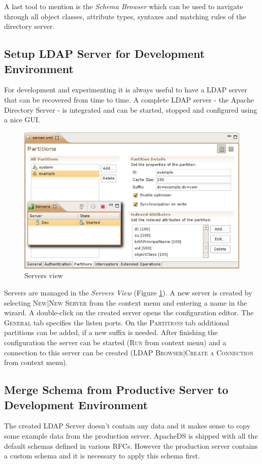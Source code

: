 \documentclass[a4paper,11pt,oneside]{article}
\begin{document}
A last tool to mention is the \textit{Schema Browser} which can be used to navigate through all object classes, attribute types, syntaxes and matching rules of the directory server.

\subsection{Setup LDAP Server for Development Environment}
For development and experimenting it is always useful to have a LDAP server that can be recovered from time to time. A complete LDAP server - the Apache Directory Server - is integrated and can be started, stopped and configured using a nice GUI.

\begin{figure}[htb]
  \begin{center}
  \includegraphics[width=12cm]{images/02_servers_view_and_xml.eps}
  \end{center}
  \caption{Servers view}
  \label{Servers view}
\end{figure}

Servers are managed in the \textit{Servers View} (Figure \ref{Servers view}). A new server is created by selecting \textsc{New|New Server} from the context menu and entering a name in the wizard. A double-click on the created server opens the configuration editor. The \textsc{General} tab specifies the listen ports. On the \textsc{Partitions} tab additional partitions can be added, if a new suffix is needed. After finishing the configuration the server can be started (\textsc{Run} from context menu) and a connection to this server can be created (\textsc{LDAP Browser|Create a Connection} from context menu).

\subsection{Merge Schema from Productive Server to Development Environment}
The created LDAP Server doesn't contain any data and it makes sense to copy some example data from the production server. ApacheDS is shipped with all the default schemas defined in various RFCs. However the production server contains a custom schema and it is necessary to apply this schema first.
\end{document}
